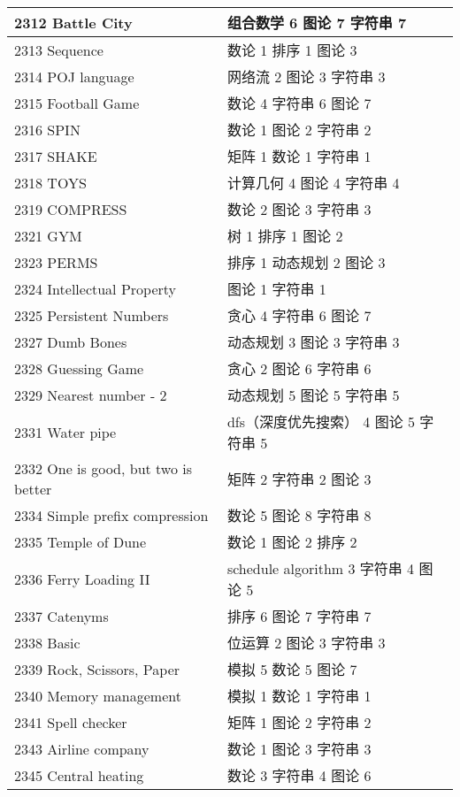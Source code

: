 \begin{longtable}{| p{} | p{} |}
 2312 Battle City  & 组合数学 6 图论 7 字符串 7 \\ \hline
 2313 Sequence  & 数论 1 排序 1 图论 3 \\ \hline
 2314 POJ language  & 网络流 2 图论 3 字符串 3 \\ \hline
 2315 Football Game  & 数论 4 字符串 6 图论 7 \\ \hline
 2316 SPIN  & 数论 1 图论 2 字符串 2 \\ \hline
 2317 SHAKE  & 矩阵 1 数论 1 字符串 1 \\ \hline
 2318 TOYS  & 计算几何 4 图论 4 字符串 4 \\ \hline
 2319 COMPRESS  & 数论 2 图论 3 字符串 3 \\ \hline
 2321 GYM  & 树 1 排序 1 图论 2 \\ \hline
 2323 PERMS  & 排序 1 动态规划 2 图论 3 \\ \hline
 2324 Intellectual Property  & 图论 1 字符串 1 \\ \hline
 2325 Persistent Numbers  & 贪心 4 字符串 6 图论 7 \\ \hline
 2327 Dumb Bones  & 动态规划 3 图论 3 字符串 3 \\ \hline
 2328 Guessing Game  & 贪心 2 图论 6 字符串 6 \\ \hline
 2329 Nearest number - 2  & 动态规划 5 图论 5 字符串 5 \\ \hline
 2331 Water pipe  & dfs（深度优先搜索） 4 图论 5 字符串 5 \\ \hline
 2332 One is good, but two is better  & 矩阵 2 字符串 2 图论 3 \\ \hline
 2334 Simple prefix compression  & 数论 5 图论 8 字符串 8 \\ \hline
 2335 Temple of Dune  & 数论 1 图论 2 排序 2 \\ \hline
 2336 Ferry Loading II  & schedule algorithm 3 字符串 4 图论 5 \\ \hline
 2337 Catenyms  & 排序 6 图论 7 字符串 7 \\ \hline
 2338 Basic  & 位运算 2 图论 3 字符串 3 \\ \hline
 2339 Rock, Scissors, Paper  & 模拟 5 数论 5 图论 7 \\ \hline
 2340 Memory management  & 模拟 1 数论 1 字符串 1 \\ \hline
 2341 Spell checker  & 矩阵 1 图论 2 字符串 2 \\ \hline
 2343 Airline company  & 数论 1 图论 3 字符串 3 \\ \hline
 2345 Central heating  & 数论 3 字符串 4 图论 6 \\ \hline

\end{longtable}
